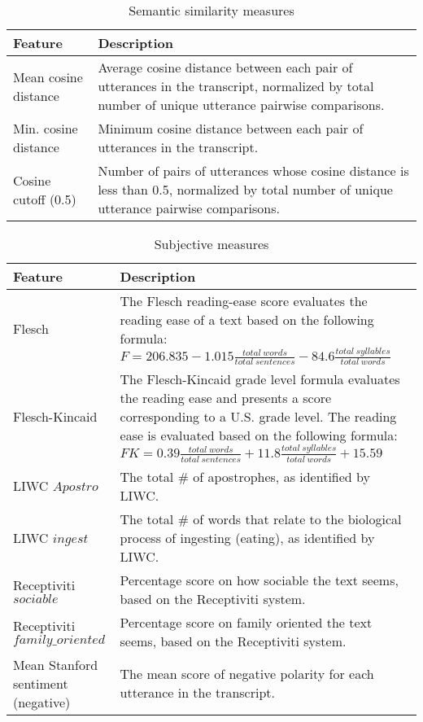 \documentclass{article}
\begin{document}
\begin{table}[h]
\caption{Semantic similarity measures}
\begin{tabular}{|p{3.5cm}|p{9.5cm}|}
\hline
\textbf{Feature} & \textbf{Description} \\ \hline
Mean cosine distance & Average cosine distance between each pair of utterances in the transcript, normalized by total number of unique utterance pairwise comparisons.\\ \hline
Min. cosine distance & Minimum cosine distance between each pair of utterances in the transcript. \\ \hline
Cosine cutoff (0.5) & Number of pairs of utterances whose cosine distance is less than 0.5, normalized by total number of unique utterance pairwise comparisons.\\ \hline
\end{tabular}
\end{table}

\begin{table}[h]
\caption{Subjective measures}
\begin{tabular}{|p{3.5cm}|p{9.5cm}|}
\hline
\textbf{Feature} & \textbf{Description} \\ \hline
Flesch & The Flesch reading-ease score evaluates the reading ease of a text based on the following formula: \newline
$F = 206.835 - 1.015 \frac{total \ words}{total \ sentences} - 84.6 \frac{total \ syllables}{total \ words}$ \newline \\ \hline
Flesch-Kincaid & The Flesch-Kincaid grade level formula evaluates the reading ease and presents a score corresponding to a U.S. grade level. The reading ease is evaluated based on the following formula: \newline
$FK = 0.39 \frac{total \ words}{total \ sentences} + 11.8 \frac{total \ syllables}{total \ words} +15.59$ \newline\\ \hline
LIWC $Apostro$ & The total \# of apostrophes, as identified by LIWC.\\ \hline
LIWC $ingest$ & The total \# of words that relate to the biological process of ingesting (eating), as identified by LIWC.\\ \hline
Receptiviti $sociable$ & Percentage score on how sociable the text seems, based on the Receptiviti system.\\ \hline
Receptiviti $family\_oriented$ & Percentage score on family oriented the text seems, based on the Receptiviti system.\\ \hline
Mean Stanford sentiment (negative) & The mean score of negative polarity for each utterance in the transcript.\\ \hline
\end{tabular}
\end{table}
\end{document}
